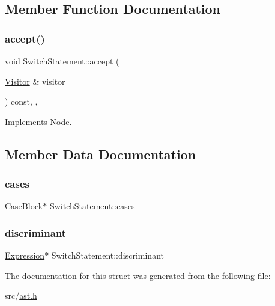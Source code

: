 \subsection{Member Function Documentation}
\mbox{\label{struct_switch_statement_a948b1d975437e623ad183d5599ce51f9}} 
\subsubsection{\texorpdfstring{accept()}{accept()}}
{\footnotesize\ttfamily void Switch\+Statement\+::accept (\begin{DoxyParamCaption}\item[{\hyperlink{struct_visitor}{Visitor} \&}]{visitor }\end{DoxyParamCaption}) const\hspace{0.3cm}{\ttfamily [inline]}, {\ttfamily [override]}, {\ttfamily [virtual]}}



Implements \hyperlink{struct_node_a10bd7af968140bbf5fa461298a969c71}{Node}.



\subsection{Member Data Documentation}
\mbox{\label{struct_switch_statement_a2e2f296ddcb9fcb69bd4daeac8c850b0}} 
\subsubsection{\texorpdfstring{cases}{cases}}
{\footnotesize\ttfamily \hyperlink{struct_case_block}{Case\+Block}$\ast$ Switch\+Statement\+::cases}

\mbox{\label{struct_switch_statement_a6b04149d29751485e93c698298ebbe5d}} 
\subsubsection{\texorpdfstring{discriminant}{discriminant}}
{\footnotesize\ttfamily \hyperlink{struct_expression}{Expression}$\ast$ Switch\+Statement\+::discriminant}



The documentation for this struct was generated from the following file\+:\begin{DoxyCompactItemize}
\item 
src/\hyperlink{ast_8h}{ast.\+h}\end{DoxyCompactItemize}
